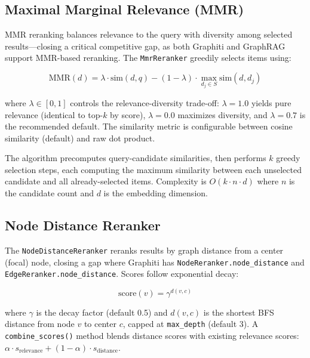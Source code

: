 \documentclass[11pt,a4paper,twocolumn]{article}
\begin{document}
\subsection{Maximal Marginal Relevance (MMR)}
\label{sec:mmr}

MMR reranking balances relevance to the query with diversity among
selected results---closing a critical competitive gap, as both Graphiti
and GraphRAG support MMR-based reranking. The \texttt{MmrReranker}
greedily selects items using:

\begin{equation}
\text{MMR}(d) = \lambda \cdot \text{sim}(d, q)
  - (1-\lambda) \cdot \max_{d_j \in S} \text{sim}(d, d_j)
\label{eq:mmr}
\end{equation}

where $\lambda \in [0, 1]$ controls the relevance-diversity trade-off:
$\lambda = 1.0$ yields pure relevance (identical to top-$k$ by score),
$\lambda = 0.0$ maximizes diversity, and $\lambda = 0.7$ is the
recommended default. The similarity metric is configurable between
cosine similarity (default) and raw dot product.

The algorithm precomputes query-candidate similarities, then performs
$k$ greedy selection steps, each computing the maximum similarity
between each unselected candidate and all already-selected items.
Complexity is $O(k \cdot n \cdot d)$ where $n$ is the candidate
count and $d$ is the embedding dimension.

\subsection{Node Distance Reranker}
\label{sec:nodedist}

The \texttt{NodeDistanceReranker} reranks results by graph distance
from a center (focal) node, closing a gap where Graphiti has
\texttt{NodeReranker.node\_distance} and
\texttt{EdgeReranker.node\_distance}. Scores follow exponential
decay:

\begin{equation}
\text{score}(v) = \gamma^{d(v, c)}
\end{equation}

where $\gamma$ is the decay factor (default 0.5) and $d(v,c)$ is
the shortest BFS distance from node $v$ to center $c$, capped at
\texttt{max\_depth} (default 3). A \texttt{combine\_scores()} method
blends distance scores with existing relevance scores:
$\alpha \cdot s_\text{relevance} + (1-\alpha) \cdot s_\text{distance}$.
\end{document}
